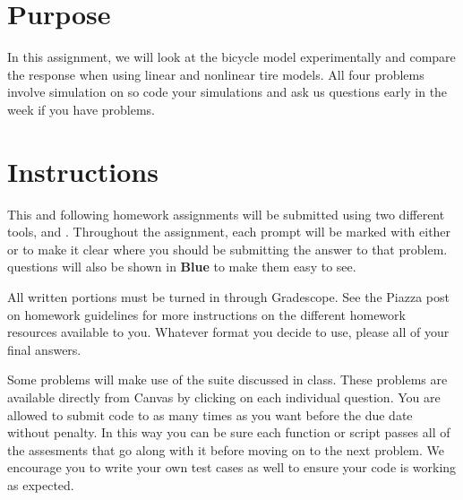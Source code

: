 
\hspace{0.5cm}

\section*{Purpose}

In this assignment, we will look at the bicycle model experimentally and compare the response when using linear and nonlinear tire models.  
All four problems involve simulation on \GRno{} so code your simulations and ask us questions early in the week if you have problems. 

\section*{Instructions}

This and following homework assignments will be submitted using two different tools, \GSno{} and \GRno{}.
Throughout the assignment, each prompt will be marked with either \GS{} or \GR{} to make it clear
where you should be submitting the answer to that problem. \GRno{} questions will also be shown in
\textbf{\color{blue}Blue} to make them easy to see.

All written portions must be turned in through Gradescope. See the Piazza post on homework guidelines for more
instructions on the different homework resources available to you. Whatever format you decide to use, please  all of your final answers.

Some problems will make use of the \GRno{} suite discussed in class. These problems are available directly from Canvas
by clicking on each individual question.
You are allowed to submit code to \GRno{} as many times as you want before the due date without penalty. In this
way you can be sure each function or script passes all of the assesments that go along with it before moving on to the
next problem. We encourage you to write
your own test cases as well to ensure your code is working as expected. 


\newpage
